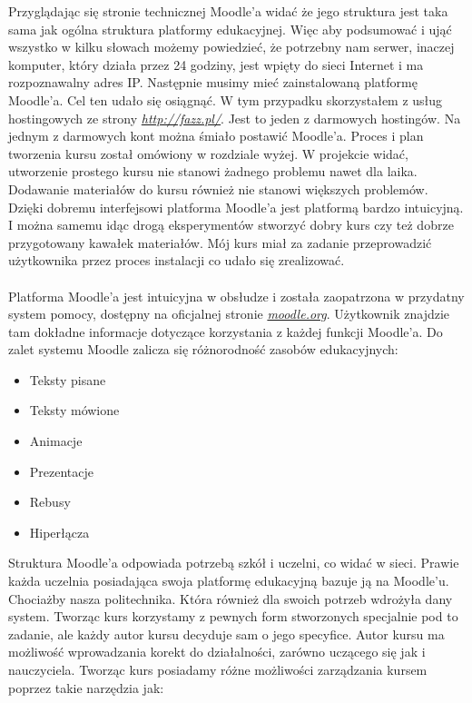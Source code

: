 \hspace{1cm} Przyglądając się stronie technicznej Moodle'a widać że jego struktura jest taka sama jak ogólna struktura platformy edukacyjnej. Więc aby podsumować i ująć wszystko w kilku słowach możemy powiedzieć, że potrzebny nam serwer, inaczej komputer, który działa przez 24 godziny, jest wpięty do sieci Internet i ma rozpoznawalny adres IP. Następnie musimy mieć zainstalowaną platformę Moodle'a. Cel ten udało się osiągnąć. W tym przypadku skorzystałem z usług hostingowych ze strony \href{http://fazz.pl/}{\textit{http://fazz.pl/}}. Jest to jeden z darmowych hostingów. Na jednym z darmowych kont można śmiało postawić Moodle'a. Proces i plan tworzenia kursu został omówiony w rozdziale wyżej. W projekcie widać, utworzenie prostego kursu nie stanowi żadnego problemu nawet dla laika. Dodawanie materiałów do kursu również nie stanowi większych problemów. Dzięki dobremu interfejsowi platforma Moodle'a jest platformą bardzo intuicyjną. I można samemu idąc drogą eksperymentów stworzyć dobry kurs czy też dobrze przygotowany kawałek materiałów. Mój kurs miał za zadanie przeprowadzić użytkownika przez proces instalacji co udało się zrealizować. \\
\ \\
Platforma Moodle'a jest intuicyjna w obsłudze i została zaopatrzona w przydatny system pomocy, dostępny na oficjalnej stronie \href{http://moodle.org}{\textit{moodle.org}}. Użytkownik znajdzie tam dokładne informacje dotyczące korzystania z każdej funkcji Moodle'a. Do zalet systemu Moodle zalicza się różnorodność zasobów edukacyjnych:
\begin{itemize}
	\item Teksty pisane
	\item Teksty mówione
	\item Animacje
	\item Prezentacje
	\item Rebusy
	\item Hiperłącza
\end{itemize}
Struktura Moodle'a odpowiada potrzebą szkół i uczelni, co widać w sieci. Prawie każda uczelnia posiadająca swoja platformę edukacyjną bazuje ją na Moodle'u. Chociażby nasza politechnika. Która również dla swoich potrzeb wdrożyła dany system. Tworząc kurs korzystamy z pewnych form stworzonych specjalnie pod to zadanie, ale każdy autor kursu decyduje sam o jego specyfice. Autor kursu ma możliwość wprowadzania korekt do działalności, zarówno uczącego się jak i nauczyciela. Tworząc kurs posiadamy różne możliwości zarządzania kursem poprzez takie narzędzia jak:
